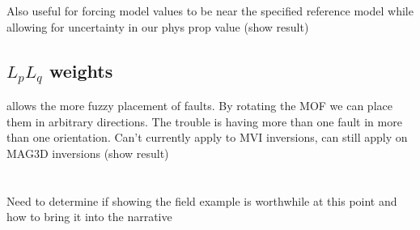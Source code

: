 Also useful for forcing model values to be near the specified reference model while allowing for uncertainty in our phys prop value
(show result)

\subsection{$L_p L_q$ weights}
\label{sec:Lp Lq weights:ElPoma1}

allows the more fuzzy placement of faults. By rotating the \ac{MOF} we can place them in arbitrary directions. The trouble is having more than one fault in more than one orientation. Can't currently apply to MVI inversions, can still apply on MAG3D inversions 
(show result)
\\\\\\
Need to determine if showing the field example is worthwhile at this point and how to bring it into the narrative

\endinput




Any text after an \endinput is ignored.
You could put scraps here or things in progress.
